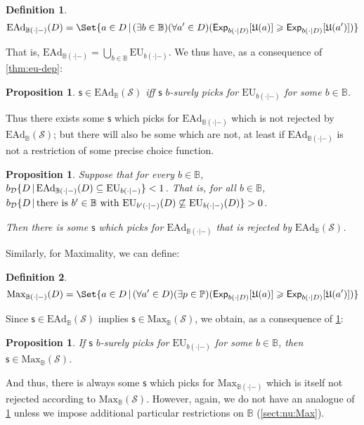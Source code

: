 \documentclass[a4paper]{article}
\newtheorem{definition}{Definition}
\newtheorem{proposition}[theorem]{Proposition}
\newcommand\D{\mathcal{D}}
\renewcommand\S{\mathcal{S}}
\newcommand\s{\mathsf{s}}
\renewcommand\P{\mathbb{P}} %
\newcommand\Exp{\mathsf{Exp}}
\newcommand\EU{\mathrm{EU}}
\newcommand\EAd{\mathrm{EAd}}
\newcommand\U{\mathfrak{U}} %
\newcommand\Maximality{\mathrm{Max}}
\newcommand{\IB}{\mathbb{B}}
\newcommand{\IP}{\P}
\newcommand{\pb}{b}
\newcommand{\todoinfo}[2][]{\todo[backgroundcolor=orange!80,bordercolor=black,linecolor=gray!80, #1,inline,caption={}]{#2}}
\renewcommand{\color}[1]{}
\newcommand{\Strategies}{\mathcal{S}}
\newcommand\SetDelimiter[1][]{
	\nonscript\,#1\vert \allowbreak \nonscript\,\mathopen{}}
\providecommand\given{\SetDelimiter}
\renewcommand{\geq}{\geqslant}
\newenvironment{CCM rewritten}
{\begingroup\color{blue}} %
{\endgroup}              %
\begin{document}
{\begin{definition}
	$$\EAd_{\IB(\cdot|-)}(D) = \Set{a \in D \given (\exists \pb \in \IB)(\forall a' \in D)(\Exp_{\pb(\cdot|D)}[\U(a)]\geq\Exp_{\pb(\cdot|D)}[\U(a')])}
	$$\end{definition}
	That is, $\EAd_{\IB(\cdot|-)}=\bigcup_{\pb\in\IB}\EU_{\pb(\cdot|-)}$. We thus have, as a consequence of \cref{thm:eu-dep}: 
	\begin{proposition}\label{thm:ead-equiv[dep]}
		$\s\in\EAd_\IB(\Strategies)$ iff $\s$ $\pb$-surely picks for $\EU_{\pb(\cdot|-)}$ for some $\pb\in \IB$. 		
	\end{proposition}
	Thus there exists some $\s$ which picks for $\EAd_{\IB(\cdot|-)}$ which is not rejected by $\EAd_\IB(\Strategies)$; but there will also be some which are not, at least if $\EAd_{\IB(\cdot|-)}$ is not a restriction of some precise choice function. 
		\begin{proposition}\label{thm:ead-existence[dep]}
Suppose that for every $\pb\in\IB$, $\pb_\D\{D\given \EAd_{\IB(\cdot|-)}(D)\subseteq\EU_{\pb(\cdot|-)}\}<1$. That is, for all $\pb\in \IB$, $\pb_\D\{D\given \text{there is $\pb'\in\IB$ with }\EU_{\pb'(\cdot|-)}(D)\not\subseteq\EU_{\pb(\cdot|-)}(D)\}>0$. 
	
	Then there is some $\s$ which picks for $\EAd_{\IB(\cdot|-)}$ that is rejected by $\EAd_\IB(\Strategies)$.
\end{proposition}

Similarly, for Maximality, we can define: 
\begin{definition}
	$$\Maximality_{\IB(\cdot|-)}(D) = \Set{a \in D \given (\forall a' \in D)(\exists p\in\IP)(\Exp_{\pb(\cdot|D)}[\U(a)]\geq\Exp_{\pb(\cdot|D)}[\U(a')])}
	$$\end{definition}
	Since $\s\in\EAd_\IB(\S)$ implies $\s\in\Maximality_\IB(\S)$, we obtain, as a consequence of \cref{thm:ead-equiv[dep]}:
	\begin{proposition}\label{thm:max-suff[dep]}
	If $\s$ $\pb$-surely picks for $\EU_{\pb(\cdot|-)}$ for some $\pb\in \IB$, then $\s\in\Maximality_\IB(\Strategies)$. 
\end{proposition}And thus, there is always some $\s$ which picks for $\Maximality_{\IB(\cdot|-)}$ which is itself not rejected according to $\Maximality_\IB(\Strategies)$. However, again, we do not have %
{\color{red} an analogue of \cref{thm:ead-existence[dep]}} unless we impose additional particular restrictions on $\IB$ (\cref{sect:nu:Max}).




}
\end{document}
